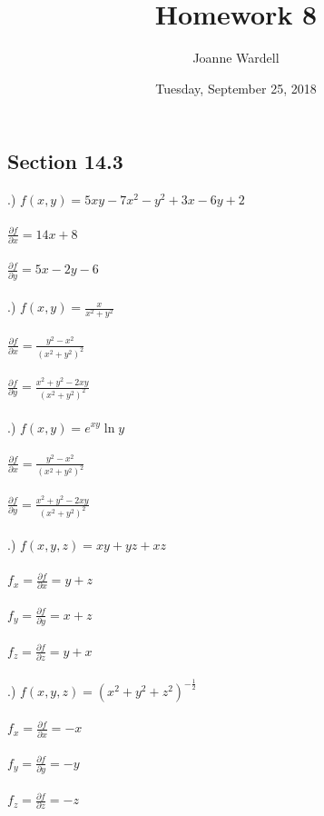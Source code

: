 \documentclass[12pt]{article}
\title{\vspace{-2.0cm}Homework 8}
\author{Joanne Wardell}
\date{Tuesday, September 25, 2018}
\begin{document}
\maketitle
\subsection*{Section 14.3}
.) $f(x,y) = 5xy-7x^{2}-y^{2}+3x-6y+2$\\\\
\noindent $\frac{\partial f}{\partial x} =  14x + 8$\\\\
\noindent $\frac{\partial f}{\partial y} = 5x -2y -6$\\\\


.) $f(x,y) = \frac{x}{x^{2}+y^{2}}$\\\\
\noindent $\frac{\partial f}{\partial x} =  \frac{y^{2} - x^{2}}{(x^{2} + y^{2})^{2}}$\\\\
\noindent $\frac{\partial f}{\partial y} = \frac{x^{2} + y^{2} - 2xy}{(x^{2} + y^{2})^{2}}$\\\\

.) $f(x,y) = e^{xy}\ln{y}$\\\\
\noindent $\frac{\partial f}{\partial x} =  \frac{y^{2} - x^{2}}{(x^{2} + y^{2})^{2}}$\\\\
\noindent $\frac{\partial f}{\partial y} = \frac{x^{2} + y^{2} - 2xy}{(x^{2} + y^{2})^{2}}$\\\\


.) $f(x,y,z) = xy+yz+xz$\\\\
\noindent $f_{x} = \frac{\partial f}{\partial x} = y + z$\\\\
\noindent $f_{y} = \frac{\partial f}{\partial y} = x + z$\\\\
\noindent $f_{z} = \frac{\partial f}{\partial z} = y + x$\\\\


.) $f(x,y,z)=(x^{2}+y^{2}+z^{2})^{-\frac{1}{2}}$\\\\
\noindent $f_{x} = \frac{\partial f}{\partial x} = -x$\\\\
\noindent $f_{y} = \frac{\partial f}{\partial y} = -y$\\\\
\noindent $f_{z} = \frac{\partial f}{\partial z} = -z$\\\\
\end{document}
